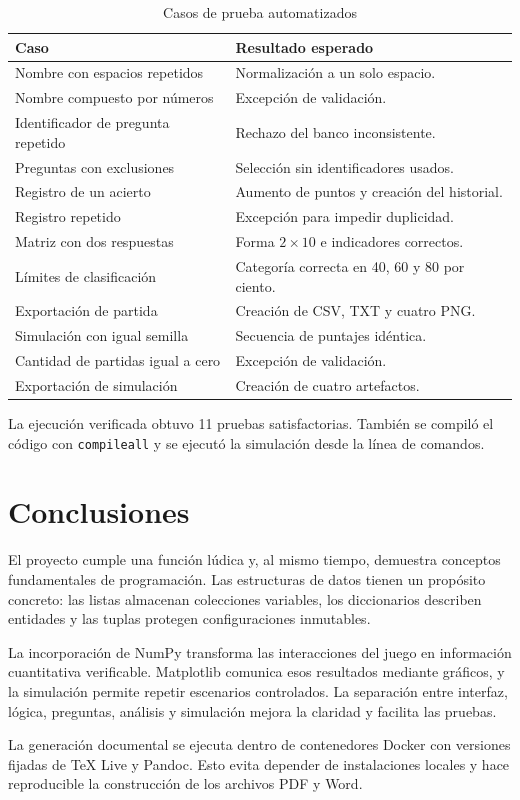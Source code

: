 \documentclass[stu,12pt,a4paper,biblatex,floatsintext]{apa7}
\begin{document}
\begin{table}[htbp]
  \centering
  \caption{Casos de prueba automatizados}
  \begin{tabular}{p{}p{}}
    \toprule
    \rowcolor{utpAzulClaro}
    \textcolor{utpAzul}{\textbf{Caso}} & \textcolor{utpAzul}{\textbf{Resultado esperado}} \\
    \midrule
    Nombre con espacios repetidos & Normalización a un solo espacio. \\
    Nombre compuesto por números & Excepción de validación. \\
    Identificador de pregunta repetido & Rechazo del banco inconsistente. \\
    Preguntas con exclusiones & Selección sin identificadores usados. \\
    Registro de un acierto & Aumento de puntos y creación del historial. \\
    Registro repetido & Excepción para impedir duplicidad. \\
    Matriz con dos respuestas & Forma $2 \times 10$ e indicadores correctos. \\
    Límites de clasificación & Categoría correcta en 40, 60 y 80 por ciento. \\
    Exportación de partida & Creación de CSV, TXT y cuatro PNG. \\
    Simulación con igual semilla & Secuencia de puntajes idéntica. \\
    Cantidad de partidas igual a cero & Excepción de validación. \\
    Exportación de simulación & Creación de cuatro artefactos. \\
    \bottomrule
  \end{tabular}
\end{table}

La ejecución verificada obtuvo 11 pruebas satisfactorias. También se compiló el código con \texttt{compileall} y se ejecutó la simulación desde la línea de comandos.

\section{Conclusiones}

El proyecto cumple una función lúdica y, al mismo tiempo, demuestra conceptos fundamentales de programación. Las estructuras de datos tienen un propósito concreto: las listas almacenan colecciones variables, los diccionarios describen entidades y las tuplas protegen configuraciones inmutables.

La incorporación de NumPy transforma las interacciones del juego en información cuantitativa verificable. Matplotlib comunica esos resultados mediante gráficos, y la simulación permite repetir escenarios controlados. La separación entre interfaz, lógica, preguntas, análisis y simulación mejora la claridad y facilita las pruebas.

La generación documental se ejecuta dentro de contenedores Docker con versiones fijadas de TeX Live y Pandoc. Esto evita depender de instalaciones locales y hace reproducible la construcción de los archivos PDF y Word.

\printbibliography
\end{document}
